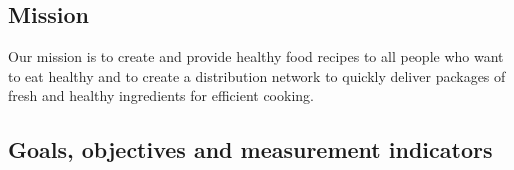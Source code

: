 \documentclass[11pt,a4paper]{article}
\begin{document}

\subsection{Mission}

Our mission is to create and provide healthy food recipes to all people who want to eat healthy and to create a distribution network to quickly deliver packages of fresh and healthy ingredients for efficient cooking.


\subsection{Goals, objectives and measurement indicators}
\end{document}
